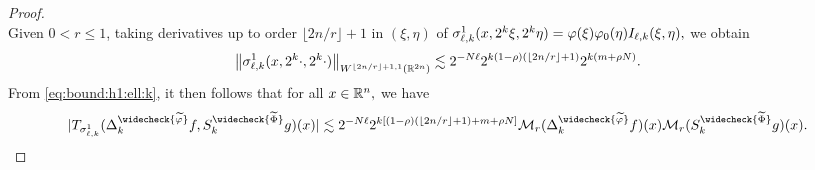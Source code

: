 \begin{proof}
\begin{equation*}
\end{equation*}
Given $0< r \le 1$, taking  derivatives up to order $\lfloor{2n/r}\rfloor + 1$ in $(\xi,\eta)$ of
$\sigma^1_{\ell, k}(x, 2^k \xi, 2^k \eta) = \varphi(\xi) \varphi_0(\eta)  I_{\ell, k}(\xi, \eta),$
 we obtain
\begin{align}\label{eq:estsigkl}
  \left\|\sigma^1_{\ell, k}(x, 2^{k} \cdot, 2^{k} \cdot)\right\|_{W^{\lfloor{2n/r}\rfloor + 1,1}(\mathbb{R}^{2n})} \lesssim 2^{- N \ell} 2^{k (1-\rho)( \lfloor{2n/r}\rfloor + 1)} 2^{k (m+\rho N)}.
\end{align}
From \eqref{eq:bound:h1:ell:k}, it then follows that for all $x\in{{\mathbb R}^n},$ we have
\begin{equation*}
|T_{\sigma^1_{\ell,k}}(\Delta^{\widecheck{\widetilde{\f}}}_k f,S^{\widecheck{\widetilde{\Phi}}}_k g)(x)|  \lesssim 2^{- N \ell} 2^{k [(1-\rho)( \lfloor{2n/r}\rfloor + 1)+m+\rho N]}    \mathcal{M}_r(\Delta^{\widecheck{{\widetilde{\f}}}}_k f)(x)\mathcal{M}_r(S^{\widecheck{\widetilde{\Phi}}}_k g)(x).
\end{equation*}


\end{proof}
